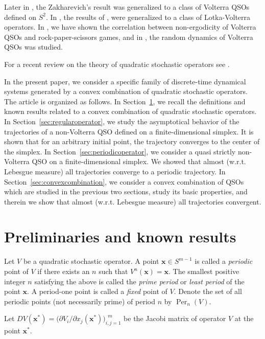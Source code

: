 \documentclass[11pt,reqno]{amsart}
\numberwithin{equation}{section} \setcounter{tocdepth}{1}
\DeclareMathOperator{\Per}{Per}
\begin{document}
Later in \cite{GZ}, the Zakharevich's result was generalized to a class of Volterra QSOs defined on $S^2$.
 In \cite{Smn}, the results of \cite{GZ}, \cite{Zus} were generalized to a class of Lotka-Volterra operators.
 In \cite{GGJ}, we  have shown the correlation between
non-ergodicity of Volterra QSOs and rock-paper-scissors games, and
in \cite{JSW}, the random dynamics of Volterra QSOs was studied.

For a recent review on the theory of quadratic stochastic operators see \cite{GMR}.

 In the present paper, we consider a specific family of discrete-time dynamical systems
generated by a convex combination of quadratic stochastic operators. The article is organized as follows.
In Section~\ref{sec:preliminaries}, we recall the definitions and known results related to a
convex combination of quadratic stochastic operators.
In Section~\ref{sec:regularoperator}, we study the asymptotical behavior of  the trajectories of a non-Volterra QSO defined on
a finite-dimensional simplex. It is shown that for an arbitrary initial point, the trajectory converges to the center
of the simplex.
In Section~\ref{sec:periodicoperator}, we consider a quasi strictly non-Volterra QSO
on a finite-dimensional simplex. We showed that almost (w.r.t. Lebesgue measure) all trajectories converge
to a periodic trajectory.
In Section~\ref{sec:convexcombination},
we consider a convex combination of QSOs which are studied in the previous two sections, study its basic properties, and therein we show that almost (w.r.t. Lebesgue measure) all trajectories convergent.

\section{Preliminaries and known results}
\label{sec:preliminaries}

Let $V$ be a quadratic stochastic operator.
A point $\mathbf{x}\in S^{m-1}$ is called a \emph{periodic} point of $V$ if there exists
an $n$  such that $V^n (\mathbf{x}) = \mathbf{x}$. The smallest positive integer $n$ satisfying the above is called
the \emph{prime period} or \emph{least period} of the point $\mathbf{x}$. A period-one point  is called a \emph{fixed} point of  $V$.
Denote the set of all periodic points (not necessarily prime) of period $n$ by $\Per_n(V)$.

Let $D V (\mathbf{x}^*) = \big(\partial V_i/\partial x_j(\mathbf{x}^*)\big)_{i,j=1}^{\ \ m}$ be the Jacobi matrix of operator $V$ at the point $\mathbf{x}^*$.
\end{document}
